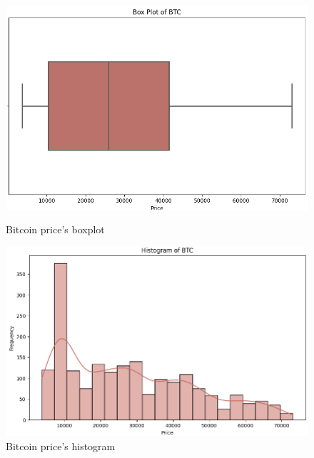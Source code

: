 \documentclass{ieeeojies}
\begin{document}
\begin{figure}[H]
	\centering
	\begin{minipage}{0.23\textwidth}
		\centering
		\includegraphics[width=1\textwidth]{bibliography/Images/BoxPlot_BTC.PNG}
		\caption{Bitcoin price's boxplot}
		\label{fig:1}
	\end{minipage}
	\hfill
	\begin{minipage}{0.23\textwidth}
		\centering
		\includegraphics[width=1\textwidth]{bibliography/Images/Histogram_BTC.PNG}
		\caption{Bitcoin price's histogram}
		\label{fig:2}
	\end{minipage}
\end{figure}
\end{document}
